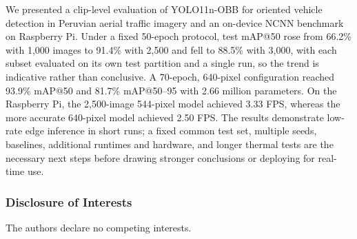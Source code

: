 \documentclass[runningheads]{llncs}
\begin{document}
We presented a clip-level evaluation of YOLO11n-OBB for oriented vehicle
detection in Peruvian aerial traffic imagery and an on-device NCNN benchmark on
Raspberry Pi. Under a fixed 50-epoch protocol, test mAP@50 rose from 66.2\% with
1,000 images to 91.4\% with 2,500 and fell to 88.5\% with 3,000, with each
subset evaluated on its own test partition and a single run, so the trend is
indicative rather than conclusive. A 70-epoch, 640-pixel configuration reached
93.9\% mAP@50 and 81.7\% mAP@50--95 with 2.66 million parameters. On the
Raspberry Pi, the 2,500-image 544-pixel model achieved 3.33 FPS, whereas the
more accurate 640-pixel model achieved 2.50 FPS. The results demonstrate
low-rate edge inference in short runs; a fixed common test set, multiple seeds,
baselines, additional runtimes and hardware, and longer thermal tests are the
necessary next steps before drawing stronger conclusions or deploying for
real-time use.

\begin{credits}
\subsubsection{Disclosure of Interests} The authors declare no competing
interests.
\end{credits}



\end{document}
